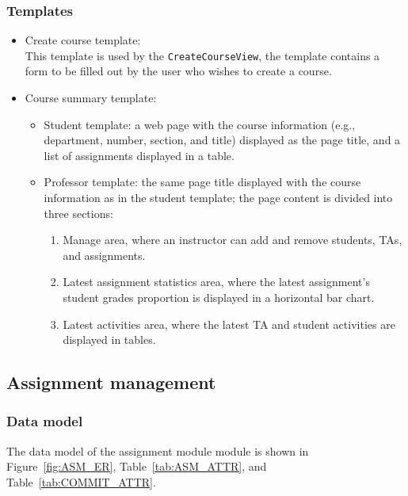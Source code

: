 \subsubsection{Templates}
\begin{itemize}
    \item Create course template: \\
        This template is used by the \texttt{CreateCourseView}, the template
        contains a form to be filled out by the user who
        wishes to create a course. 
    \item Course summary template:
    \begin{itemize}
        \item Student template: a web page with the course information
            (e.g., department, number, section, and title)
            displayed as the page title, and a list of assignments displayed
            in a table.
        \item Professor template: the same page title displayed with the course
            information as in the student template;
            the page content is divided into three sections:
            \begin{enumerate}
                \item Manage area, where an instructor can add and remove
                    students, TAs, and assignments.
                \item Latest assignment statistics area, where the latest
                    assignment's student grades proportion is displayed
                    in a horizontal bar chart.
                \item Latest activities area, where the latest TA and student
                    activities are displayed in tables.
            \end{enumerate}
    \end{itemize}
\end{itemize}





\subsection{Assignment management}
\label{sec:ASM_MAN}

\subsubsection{Data model}
The data model of the assignment module module is shown in
Figure~\ref{fig:ASM_ER}, Table~\ref{tab:ASM_ATTR},
and Table~\ref{tab:COMMIT_ATTR}. \bigskip

